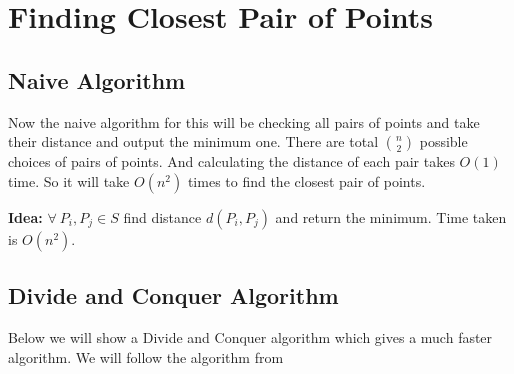 \chapter{Finding Closest Pair of Points}

\begin{algoprob}
\end{algoprob}

\section{Naive Algorithm}

Now the naive algorithm for this will be checking all pairs of points and take their distance and output the minimum one. There are total $\binom{n }{2}$ possible choices of pairs of points. And calculating the distance of each pair takes $O(1)$ time. So it will take $O(n^2)$ times to find the closest pair of points. \parinf

\textbf{Idea:} $\forall\ P_i,P_j\in S$ find distance $d(P_i,P_j)$ and return the minimum. Time taken is $O(n^2)$. 

\section{Divide and Conquer Algorithm}
Below we will show a Divide and Conquer algorithm which gives a much faster algorithm. We will follow the  algorithm from \cite[Section 33.4]{CormenThomasLeisersonCharlesRivestRonaldSteinClifford_BOOK}

